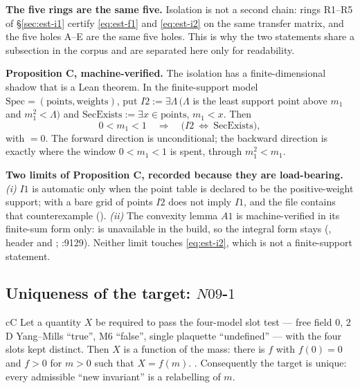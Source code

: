 \noindent\textbf{The five rings are the same five.} Isolation is not a second chain: rings R1--R5 of
\S\ref{sec:est-i1} certify \eqref{eq:est-f1} and \eqref{eq:est-i2} on the same transfer matrix, and
the five holes A--E are the same five holes. This is why the two statements share a subsection in
the corpus and are separated here only for readability.

\smallskip
\noindent\textbf{Proposition C, machine-verified.} The isolation has a finite-dimensional shadow that
is a Lean theorem. In the finite-support model $\mathrm{Spec}=(\text{points},\text{weights})$, put
$I2:=\exists\Lambda\,(\Lambda$ is the least support point above $m_1$ and $m_1^2<\Lambda)$ and
$\mathrm{SecExists}:=\exists x\in\text{points},\,m_1<x$. Then
\begin{equation}
0<m_1<1\quad\Longrightarrow\quad\bigl(I2\ \Longleftrightarrow\ \mathrm{SecExists}\bigr),
\label{eq:est-propc}
\end{equation}
with  $=0$. The forward direction is unconditional; the backward direction is exactly
where the window $0<m_1<1$ is spent, through $m_1^2<m_1$.

\smallskip
\noindent\textbf{Two limits of Proposition C, recorded because they are load-bearing.}
\emph{(i)} $I1$ is automatic only when the point table is declared to be the positive-weight support;
with a bare grid of points $I2$ does not imply $I1$, and the file contains that counterexample
(). \emph{(ii)} The convexity lemma $A1$ is machine-verified in its
finite-sum form only:  is unavailable in the build, so the integral form stays
\LC{} (, header and ; :9129). Neither limit
touches \eqref{eq:est-i2}, which is not a finite-support statement.

\subsection{Uniqueness of the target: \texorpdfstring{$N09$-$1$}{N09-1}}
\label{sec:est-n09}

\begin{claimbox}{cC}
 Let a quantity $X$ be required to pass the four-model slot test --- free
field $0$, $2$D Yang--Mills ``true'', M6 ``false'', single plaquette ``undefined'' --- with the four
slots kept distinct. Then $X$ is a function of the mass: there is $f$ with $f(0)=0$ and $f>0$ for
$m>0$ such that $X=f(m)$. \LC. Consequently the target is unique: every admissible ``new
invariant'' is a relabelling of $m$.
\end{claimbox}

